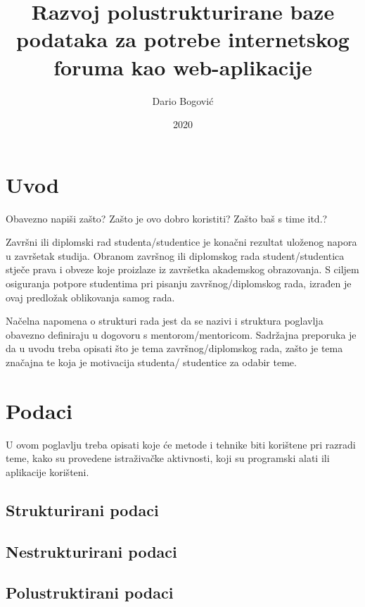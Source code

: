 \documentclass{foi}
\title{Razvoj polustrukturirane baze podataka za potrebe internetskog foruma kao web-aplikacije}
\author{Dario Bogović}
\date{2020}
\begin{document}
\maketitle

\tableofcontents

\pagestyle{plain}
\chapter{Uvod}

Obavezno napiši zašto? Zašto je ovo dobro koristiti? Zašto baš s time itd.?

Završni ili diplomski rad studenta/studentice je konačni rezultat uloženog napora u završetak studija. Obranom završnog ili diplomskog rada student/studentica stječe prava i obveze koje proizlaze iz završetka akademskog obrazovanja. S ciljem osiguranja potpore studentima pri pisanju završnog/diplomskog rada, izrađen je ovaj predložak oblikovanja samog rada.

Načelna napomena o strukturi rada jest da se nazivi i struktura poglavlja obavezno definiraju u dogovoru s mentorom/mentoricom. Sadržajna preporuka je da u uvodu treba opisati što je tema završnog/diplomskog rada, zašto je tema značajna te koja je motivacija studenta/ studentice za odabir teme. 

\chapter{Podaci}

U ovom poglavlju treba opisati koje će metode i tehnike biti korištene pri razradi teme, kako su provedene istraživačke aktivnosti, koji su programski alati ili aplikacije korišteni.

\section{Strukturirani podaci}

\lipsum[1]

\section{Nestrukturirani podaci}

\lipsum[1]

\section{Polustruktirani podaci}
\end{document}
